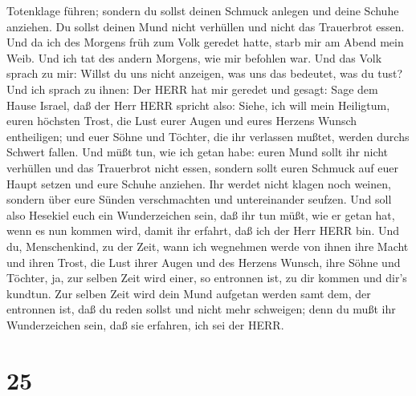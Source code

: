 Totenklage führen; sondern du sollst deinen Schmuck anlegen und deine
Schuhe anziehen. Du sollst deinen Mund nicht verhüllen und nicht das
Trauerbrot essen.  Und da ich des Morgens früh zum Volk
geredet hatte, starb mir am Abend mein Weib. Und ich tat des andern
Morgens, wie mir befohlen war.  Und das Volk sprach zu mir:
Willst du uns nicht anzeigen, was uns das bedeutet, was du tust?
 Und ich sprach zu ihnen: Der HERR hat mir geredet und
gesagt:  Sage dem Hause Israel, daß der Herr HERR spricht
also: Siehe, ich will mein Heiligtum, euren höchsten Trost, die Lust
eurer Augen und eures Herzens Wunsch entheiligen; und euer Söhne und
Töchter, die ihr verlassen mußtet, werden durchs Schwert fallen.
 Und müßt tun, wie ich getan habe: euren Mund sollt ihr
nicht verhüllen und das Trauerbrot nicht essen,  sondern
sollt euren Schmuck auf euer Haupt setzen und eure Schuhe anziehen. Ihr
werdet nicht klagen noch weinen, sondern über eure Sünden verschmachten
und untereinander seufzen.  Und soll also Hesekiel euch ein
Wunderzeichen sein, daß ihr tun müßt, wie er getan hat, wenn es nun
kommen wird, damit ihr erfahrt, daß ich der Herr HERR bin. 
Und du, Menschenkind, zu der Zeit, wann ich wegnehmen werde von ihnen
ihre Macht und ihren Trost, die Lust ihrer Augen und des Herzens Wunsch,
ihre Söhne und Töchter,  ja, zur selben Zeit wird einer, so
entronnen ist, zu dir kommen und dir's kundtun.  Zur selben
Zeit wird dein Mund aufgetan werden samt dem, der entronnen ist, daß du
reden sollst und nicht mehr schweigen; denn du mußt ihr Wunderzeichen
sein, daß sie erfahren, ich sei der HERR.

\hypertarget{section-24}{%
\section{25}\label{section-24}}

